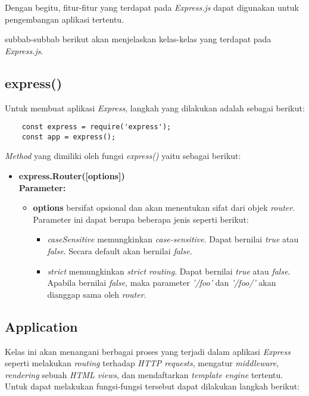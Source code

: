 Dengan begitu, fitur-fitur yang terdapat pada \textit{Express.js} dapat digunakan untuk pengembangan aplikasi tertentu.

subbab-subbab berikut akan menjelaskan kelas-kelas yang terdapat pada \textit{Express.js}.

\subsection{express()}
Untuk membuat aplikasi \textit{Express}, langkah yang dilakukan adalah sebagai berikut:
\begin{lstlisting}
	const express = require('express');
	const app = express();
\end{lstlisting}

\textit{Method} yang dimiliki oleh fungsi \textit{express()} yaitu sebagai berikut:

\begin{itemize}
	\item \textbf{express.Router([options])} \\ \textbf{Parameter:} 
	\begin{itemize}
		\item \textbf{options} bersifat opsional dan akan menentukan sifat dari objek \textit{router}. Parameter ini dapat berupa beberapa jenis seperti berikut:
		\begin{itemize}
			\item \textit{caseSensitive} memungkinkan \textit{case-sensitive}. Dapat bernilai \textit{true} atau \textit{false}. Secara default akan bernilai \textit{false}.
			
			\item \textit{strict} memungkinkan \textit{strict routing}. Dapat bernilai \textit{true} atau \textit{false}. Apabila bernilai \textit{false}, maka parameter \textit{'/foo'} dan \textit{'/foo/'} akan dianggap sama oleh \textit{router}.
		\end{itemize}
	\end{itemize}
	
\end{itemize}

\subsection{Application}
Kelas ini akan menangani berbagai proses yang terjadi dalam aplikasi \textit{Express} seperti melakukan \textit{routing} terhadap \textit{HTTP requests}, mengatur \textit{middleware}, \textit{rendering} sebuah \textit{HTML views}, dan mendaftarkan \textit{template engine} tertentu. Untuk dapat melakukan fungsi-fungsi tersebut dapat dilakukan langkah berikut:

